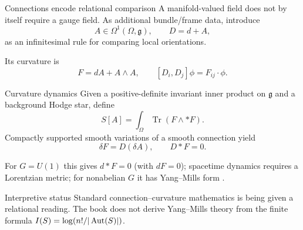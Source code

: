 \begin{frame}{Connections encode relational comparison}
  A manifold-valued field does not by itself require a gauge field.
  As additional bundle/frame data, introduce
  \[
    A\in\Omega^1(\Omega,\mathfrak g),
    \qquad
    D=d+A,
  \]
  as an infinitesimal rule for comparing local orientations.

  Its curvature is
  \[
    F=dA+A\wedge A,
    \qquad
    [D_i,D_j]\phi=F_{ij}\cdot\phi.
  \]

  \begin{center}
  \end{center}
\end{frame}

\begin{frame}{Curvature dynamics}
  Given a positive-definite invariant inner product on $\mathfrak g$ and a background Hodge
  star, define
  \[
    S[A]=\int_\Omega\operatorname{Tr}(F\wedge *F).
  \]
  Compactly supported smooth variations of a smooth connection yield
  \[
    \delta F=D(\delta A),
    \qquad
    \boxed{D*F=0.}
  \]

  For $G=U(1)$ this gives $d*F=0$ (with $dF=0$); spacetime dynamics
  requires a Lorentzian metric;
  for nonabelian $G$ it has Yang--Mills form \cite{yangmills1954}.

  \begin{alertblock}{Interpretive status}
    Standard connection--curvature mathematics is being given a relational
    reading. The book does not derive Yang--Mills theory from the finite formula
    $I(S)=\log(n!/|\operatorname{Aut}(S)|)$.
  \end{alertblock}
\end{frame}

